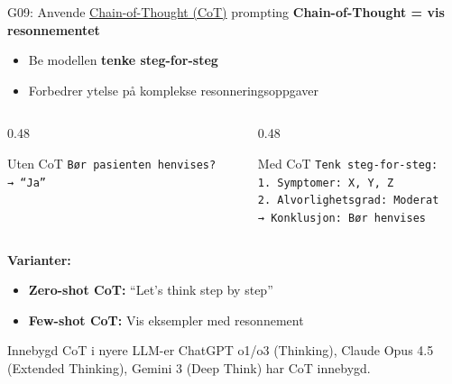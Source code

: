 \documentclass[aspectratio=169, 10pt]{beamer}
\begin{document}
\begin{frame}{G09: Anvende \href{https://en.wikipedia.org/wiki/Prompt_engineering\#Chain-of-thought}{Chain-of-Thought (CoT)} prompting}
    \textbf{Chain-of-Thought = vis resonnementet}
    \begin{itemize}
        \item Be modellen \textbf{tenke steg-for-steg}
        \item Forbedrer ytelse på komplekse resonneringsoppgaver
    \end{itemize}

    \vspace{0.2cm}
    \begin{columns}[T]
        \begin{column}{0.48\textwidth}
            \begin{alertblock}{\footnotesize Uten CoT}
                \footnotesize
                \texttt{Bør pasienten henvises?} \\
                \texttt{→ ``Ja''}
            \end{alertblock}
        \end{column}
        \begin{column}{0.48\textwidth}
            \begin{block}{\footnotesize Med CoT}
                \footnotesize
                \texttt{Tenk steg-for-steg:} \\
                \texttt{1. Symptomer: X, Y, Z} \\
                \texttt{2. Alvorlighetsgrad: Moderat} \\
                \texttt{→ Konklusjon: Bør henvises}
            \end{block}
        \end{column}
    \end{columns}

    \vspace{0.15cm}
    \textbf{Varianter:}
    \begin{itemize}
        \item \textbf{Zero-shot CoT:} ``Let's think step by step''
        \item \textbf{Few-shot CoT:} Vis eksempler med resonnement
    \end{itemize}

    \begin{block}{\footnotesize Innebygd CoT i nyere LLM-er}
        \footnotesize ChatGPT o1/o3 (Thinking), Claude Opus 4.5 (Extended Thinking), Gemini 3 (Deep Think) har CoT innebygd.
    \end{block}
\end{frame}
\end{document}
